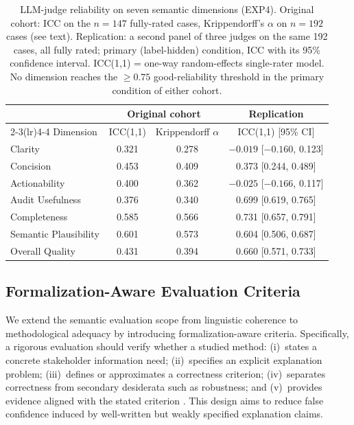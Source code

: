 \documentclass[10pt]{article}
\begin{document}
\begin{table}[t]
\centering
\caption{LLM-judge reliability on seven semantic dimensions (EXP4). Original
cohort: ICC on the $n=147$ fully-rated cases, Krippendorff's $\alpha$ on
$n=192$ cases (see text). Replication: a second panel of three judges on the
same 192 cases, all fully rated; primary (label-hidden) condition, ICC with
its 95\% confidence interval. ICC(1,1) = one-way random-effects single-rater
model. No dimension reaches the $\geq 0.75$ good-reliability threshold
\citep{koo2016guideline} in the primary condition of either cohort.}
\label{tab:exp4_icc}
\small
\begin{tabular}{lccc}
\toprule
                       & \multicolumn{2}{c}{Original cohort} & Replication \\
\cmidrule(lr){2-3}\cmidrule(lr){4-4}
Dimension              & ICC(1,1) & Krippendorff $\alpha$ & ICC(1,1) [95\% CI] \\
\midrule
Clarity                & 0.321    & 0.278 & $-0.019$ [$-0.160$, 0.123] \\
Concision              & 0.453    & 0.409 & 0.373 [0.244, 0.489] \\
Actionability          & 0.400    & 0.362 & $-0.025$ [$-0.166$, 0.117] \\
Audit Usefulness       & 0.376    & 0.340 & 0.699 [0.619, 0.765] \\
Completeness           & 0.585    & 0.566 & 0.731 [0.657, 0.791] \\
Semantic Plausibility  & 0.601    & 0.573 & 0.604 [0.506, 0.687] \\
Overall Quality        & 0.431    & 0.394 & 0.660 [0.571, 0.733] \\
\bottomrule
\end{tabular}
\end{table}

\subsection{Formalization-Aware Evaluation Criteria}
\label{sec:formalization_aware}

We extend the semantic evaluation scope from linguistic coherence to
methodological adequacy by introducing formalization-aware criteria.
Specifically, a rigorous evaluation should verify whether a studied method:
(i)~states a concrete stakeholder information need; (ii)~specifies an
explicit explanation problem; (iii)~defines or approximates a correctness
criterion; (iv)~separates correctness from secondary desiderata such as
robustness; and (v)~provides evidence aligned with the stated criterion
\citep{haufe2026formalization,sokol2020factsheets}. This design aims to
reduce false confidence induced by well-written but weakly specified
explanation claims.
\end{document}

